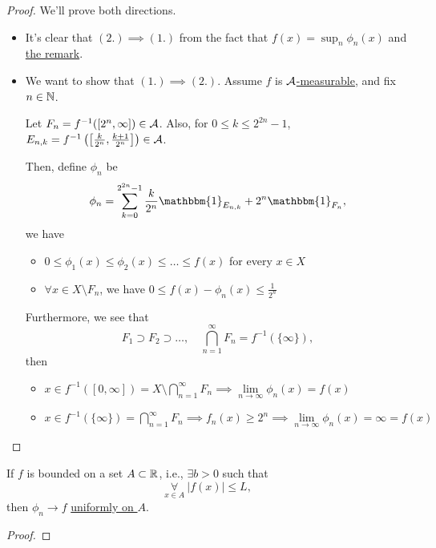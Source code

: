 \begin{proof}
	We'll prove both directions.
	\begin{itemize}
		\item It's clear that \((2.)\implies (1.)\) from the fact that \(f(x) = \sup_n \phi _{n}(x)\) and \hyperref[rmk:Operations-preserve-measurability]{the remark}.
		\item We want to show that \((1.)\implies (2.)\). Assume \(f\) is \hyperref[def:A-measurable-function]{\(\mathcal{\MakeUppercase{a}} \)-measurable}, and fix \(n\in\mathbb{\MakeUppercase{n}} \).

		      \par Let \(F_{n} =f^{-1} ([2^n, \infty ])\in \mathcal{\MakeUppercase{a}}\). Also, for \(0\leq k\leq 2^{2n}-1\), \(E_{n, k} = f^{-1} \left(\left[\frac{k}{2^n}, \frac{k+1}{2^n}\right]\right)\in \mathcal{\MakeUppercase{a}} \).

		      \par Then, define \(\phi _{n}\) be
		      \[
			      \phi _{n} = \sum\limits_{k=0}^{2^{2n} - 1}\frac{k}{2^n}\mathbbm{1}_{E_{n, k}}  + 2^n \mathbbm{1}_{F_n},
		      \]
		      we have
		      \begin{itemize}
			      \item \(0\leq \phi _1(x)\leq \phi _2(x)\leq \ldots \leq f(x) \) for every \(x\in X\)
			      \item \(\forall x\in X\setminus F_{n}\), we have \(0\leq f(x) - \phi _{n}(x)\leq \frac{1}{2^n}\)
		      \end{itemize}

		      \par Furthermore, we see that
		      \[
			      F_1\supset F_2\supset \ldots ,\quad \bigcap\limits_{n=1}^{\infty} F_{n} = f^{-1} (\{\infty \}),
		      \]
		      then
		      \begin{itemize}
			      \item \(x\in f^{-1} ([0, \infty ]) = X\setminus \bigcap\limits_{n=1}^{\infty} F_{n} \implies \lim\limits_{n \to \infty} \phi _{n}(x) = f(x)\)
			      \item \(x\in f^{-1} (\{\infty \}) = \bigcap\limits_{n=1}^{\infty} F_{n}\implies f_{n}(x)\geq 2^n \implies \lim\limits_{n \to \infty} \phi _{n}(x) = \infty = f(x)\)
		      \end{itemize}
	\end{itemize}
\end{proof}

\begin{corollary}
	If \(f\) is bounded on a set \(A\subset \mathbb{\MakeUppercase{r}} \), i.e., \(\exists b>0 \) such that
	\[
		\underset{x\in A}{\forall }\ \left\vert f(x) \right\vert \leq L,
	\]
	then \(\phi _{n}\to f \) \underline{uniformly on \(A\)}.
\end{corollary}
\begin{proof}
\end{proof}

